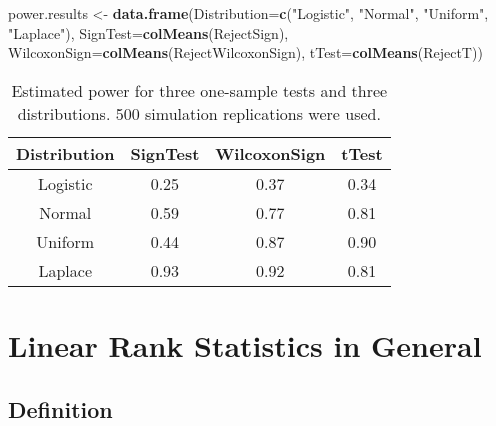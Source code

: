 \documentclass[]{book}
\newenvironment{Shaded}{\begin{snugshade}}{\end{snugshade}}
\newcommand{\DataTypeTok}[1]{\textcolor[rgb]{0.13,0.29,0.53}{#1}}
\newcommand{\KeywordTok}[1]{\textcolor[rgb]{0.13,0.29,0.53}{\textbf{#1}}}
\newcommand{\NormalTok}[1]{#1}
\newcommand{\StringTok}[1]{\textcolor[rgb]{0.31,0.60,0.02}{#1}}
\begin{document}
\begin{Shaded}
\begin{Highlighting}[]
\NormalTok{power.results <-}\StringTok{ }\KeywordTok{data.frame}\NormalTok{(}\DataTypeTok{Distribution=}\KeywordTok{c}\NormalTok{(}\StringTok{"Logistic"}\NormalTok{, }\StringTok{"Normal"}\NormalTok{, }\StringTok{"Uniform"}\NormalTok{, }\StringTok{"Laplace"}\NormalTok{),}
                 \DataTypeTok{SignTest=}\KeywordTok{colMeans}\NormalTok{(RejectSign), }\DataTypeTok{WilcoxonSign=}\KeywordTok{colMeans}\NormalTok{(RejectWilcoxonSign),}
                 \DataTypeTok{tTest=}\KeywordTok{colMeans}\NormalTok{(RejectT))}
\end{Highlighting}
\end{Shaded}

\begin{table}[ht]
\centering
\begin{tabular}{cccc}
  \hline
Distribution & SignTest & WilcoxonSign & tTest \\ 
  \hline
Logistic & 0.25 & 0.37 & 0.34 \\ 
  Normal & 0.59 & 0.77 & 0.81 \\ 
  Uniform & 0.44 & 0.87 & 0.90 \\ 
  Laplace & 0.93 & 0.92 & 0.81 \\ 
   \hline
\end{tabular}
\caption{Estimated power for three one-sample tests and
              three distributions. 500 simulation replications were used.} 
\end{table}

\hypertarget{linear-rank-statistics-in-general}{%
\section{Linear Rank Statistics in General}\label{linear-rank-statistics-in-general}}

\hypertarget{definition-1}{%
\subsection{Definition}\label{definition-1}}
\end{document}
